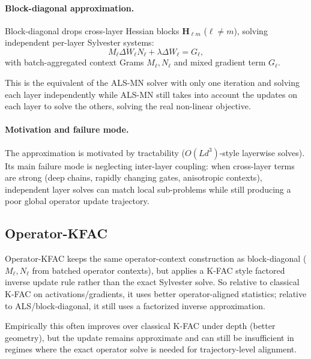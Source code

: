 \documentclass{article}
\begin{document}
\paragraph{Block-diagonal approximation.}
Block-diagonal drops cross-layer Hessian blocks $\mathbf H_{\ell m}$ ($\ell\neq m$),
solving independent per-layer Sylvester systems:
\[
M_\ell \Delta W_\ell N_\ell + \lambda \Delta W_\ell = G_\ell,
\]
with batch-aggregated context Grams $M_\ell,N_\ell$ and mixed gradient term $G_\ell$.

This is the equivalent of the ALS-MN solver with only one iteration and solving each layer independently while ALS-MN still takes into account the updates on each layer to solve the others, solving the real non-linear objective.

\paragraph{Motivation and failure mode.}
The approximation is motivated by tractability ($O(Ld^3)$-style layerwise solves).
Its main failure mode is neglecting inter-layer coupling: when cross-layer terms
are strong (deep chains, rapidly changing gates, anisotropic contexts), independent
layer solves can match local sub-problems while still producing a poor global
operator update trajectory.

\subsection{Operator-KFAC}
\label{app:operator-kfac-variant}

Operator-KFAC keeps the same operator-context construction as block-diagonal
($M_\ell,N_\ell$ from batched operator contexts), but applies a K-FAC style
factored inverse update rule rather than the exact Sylvester solve.
So relative to classical K-FAC on activations/gradients, it uses better
operator-aligned statistics; relative to ALS/block-diagonal, it still uses a
factorized inverse approximation.

Empirically this often improves over classical K-FAC under depth (better geometry),
but the update remains approximate and can still be insufficient in regimes where
the exact operator solve is needed for trajectory-level alignment.
\end{document}
